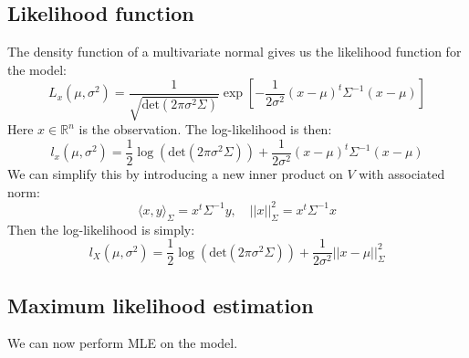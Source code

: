 \documentclass[12pt, a4paper]{article}
\numberwithin{equation}{section}
\begin{document}
\subsection{Likelihood function}
The density function of a multivariate normal gives us the likelihood function for the model:
\begin{equation}
L_x(\mu,\sigma^2)=\frac{1}{\sqrt{\textrm{det}(2\pi\sigma^2\Sigma)}}\exp\left[-\frac{1}{2\sigma^2}(x-\mu)^t\Sigma^{-1}(x-\mu)\right]
\end{equation}
Here $x\in\mathbb{R}^n$ is the observation. The log-likelihood is then:
\begin{equation}
l_x(\mu,\sigma^2)=\frac{1}{2}\log\left(\textrm{det}(2\pi\sigma^2\Sigma)\right)+\frac{1}{2\sigma^2}(x-\mu)^t\Sigma^{-1}(x-\mu)
\end{equation}
We can simplify this by introducing a new inner product on $V$ with associated norm:
\begin{equation}
\langle x,y\rangle_\Sigma=x^t\Sigma^{-1}y,\quad ||x||^2_\Sigma=x^t\Sigma^{-1}x
\end{equation}
Then the log-likelihood is simply:
\begin{equation}
l_X(\mu,\sigma^2)=\frac{1}{2}\log\left(\textrm{det}(2\pi\sigma^2\Sigma)\right)+\frac{1}{2\sigma^2}||x-\mu||^2_\Sigma
\end{equation}

\subsection{Maximum likelihood estimation}
We can now perform MLE on the model. 
\end{document}
